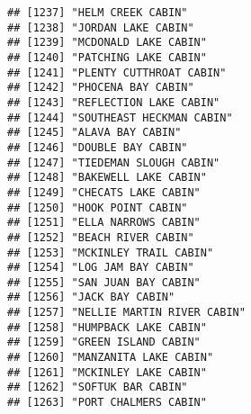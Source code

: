 \documentclass[
]{article}
\begin{document}
\begin{verbatim}
## [1237] "HELM CREEK CABIN"                                                                    
## [1238] "JORDAN LAKE CABIN"                                                                   
## [1239] "MCDONALD LAKE CABIN"                                                                 
## [1240] "PATCHING LAKE CABIN"                                                                 
## [1241] "PLENTY CUTTHROAT CABIN"                                                              
## [1242] "PHOCENA BAY CABIN"                                                                   
## [1243] "REFLECTION LAKE CABIN"                                                               
## [1244] "SOUTHEAST HECKMAN CABIN"                                                             
## [1245] "ALAVA BAY CABIN"                                                                     
## [1246] "DOUBLE BAY CABIN"                                                                    
## [1247] "TIEDEMAN SLOUGH CABIN"                                                               
## [1248] "BAKEWELL LAKE CABIN"                                                                 
## [1249] "CHECATS LAKE CABIN"                                                                  
## [1250] "HOOK POINT CABIN"                                                                    
## [1251] "ELLA NARROWS CABIN"                                                                  
## [1252] "BEACH RIVER CABIN"                                                                   
## [1253] "MCKINLEY TRAIL CABIN"                                                                
## [1254] "LOG JAM BAY CABIN"                                                                   
## [1255] "SAN JUAN BAY CABIN"                                                                  
## [1256] "JACK BAY CABIN"                                                                      
## [1257] "NELLIE MARTIN RIVER CABIN"                                                           
## [1258] "HUMPBACK LAKE CABIN"                                                                 
## [1259] "GREEN ISLAND CABIN"                                                                  
## [1260] "MANZANITA LAKE CABIN"                                                                
## [1261] "MCKINLEY LAKE CABIN"                                                                 
## [1262] "SOFTUK BAR CABIN"                                                                    
## [1263] "PORT CHALMERS CABIN"                                                                 

\end{verbatim}
\end{document}
